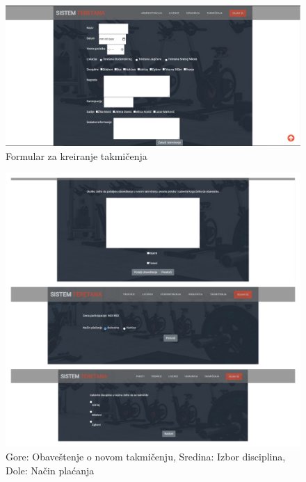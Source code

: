 \documentclass[../main.tex]{subfiles}
\begin{document}
\begin{figure}[!ht]
\begin{center}
\includegraphics[scale=0.30]{sections/korisnicki_interfejs/screenshots/takmicenja_kreiranje.PNG}
\end{center}
\caption{Formular za kreiranje takmičenja}
\label{fig:t_kreiranje}
\end{figure}


\begin{figure}[!ht]
\begin{center}
\includegraphics[scale=0.30]{sections/korisnicki_interfejs/screenshots/takmicenjaNovoIdisciplina.png}
\end{center}
\caption{Gore: Obaveštenje o novom takmičenju, Sredina: Izbor disciplina, Dole: Način plaćanja}
\label{fig:t_kreiranje_ob}
\end{figure}
\end{document}

